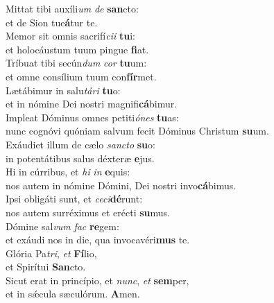 \evenverse Mittat tibi auxíli\textit{um} \textit{de} \textbf{san}cto:~\*\\
\evenverse et de Sion tue\textbf{á}tur te.\\
\oddverse Memor sit omnis sacrifí\textit{ci}\textit{i} \textbf{tu}i:~\*\\
\oddverse et holocáustum tuum pingue \textbf{fi}at.\\
\evenverse Tríbuat tibi secún\textit{dum} \textit{cor} \textbf{tu}um:~\*\\
\evenverse et omne consílium tuum con\textbf{fír}met.\\
\oddverse Lætábimur in salu\textit{tá}\textit{ri} \textbf{tu}o:~\*\\
\oddverse et in nómine Dei nostri magnifi\textbf{cá}bimur.\\
\evenverse Impleat Dóminus omnes petiti\textit{ó}\textit{nes} \textbf{tu}as:~\*\\
\evenverse nunc cognóvi quóniam salvum fecit Dóminus Christum \textbf{su}um.\\
\oddverse Exáudiet illum de cælo \textit{san}\textit{cto} \textbf{su}o:~\*\\
\oddverse in potentátibus salus déxteræ \textbf{e}jus.\\
\evenverse Hi in cúrribus, et \textit{hi} \textit{in} \textbf{e}quis:~\*\\
\evenverse nos autem in nómine Dómini, Dei nostri invo\textbf{cá}bimus.\\
\oddverse Ipsi obligáti sunt, et \textit{ce}\textit{ci}\textbf{dé}runt:~\*\\
\oddverse nos autem surréximus et erécti \textbf{su}mus.\\
\evenverse Dómine sal\textit{vum} \textit{fac} \textbf{re}gem:~\*\\
\evenverse et exáudi nos in die, qua invocavéri\textbf{mus} te.\\
\oddverse Glória Pa\textit{tri}, \textit{et} \textbf{Fí}lio,~\*\\
\oddverse et Spirítui \textbf{San}cto.\\
\evenverse Sicut erat in princípio, et \textit{nunc}, \textit{et} \textbf{sem}per,~\*\\
\evenverse et in sǽcula sæculórum. \textbf{A}men.\\
